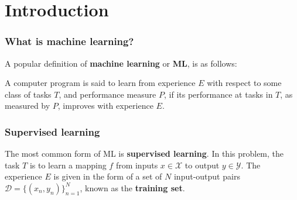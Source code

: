 \part{Introduction}
\section{What is machine learning?}
\noindent
A popular definition of \textbf{machine learning} or \textbf{ML}, is as follows:
\par
A computer program is said to learn from experience $E$ with respect to some class of tasks $T$, and performance measure $P$, if its performance at tasks in $T$, as measured by $P$, improves with experience $E$.
\section{Supervised learning}
The most common form of ML is \textbf{supervised learning}. In this problem, the task $T$ is to learn a mapping $f$ from inputs $x\in \mathcal{X}$ to output $y \in \mathcal{Y}$. The experience $E$ is given in the form of a set of $N$ input-output pairs $\mathcal{D} = \{(x_n, y_n)\}^{N}_{n=1}$, known as the \textbf{training set}.
